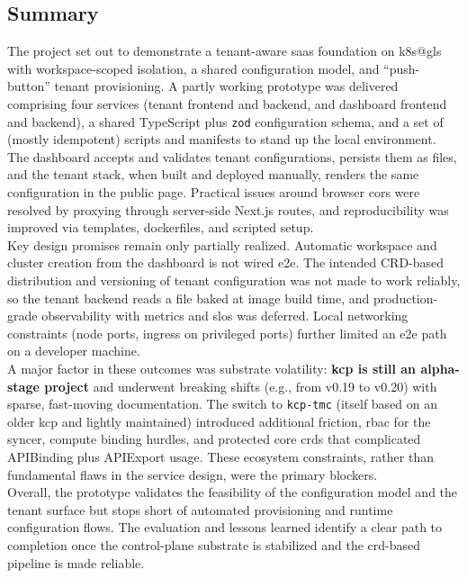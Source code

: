 \documentclass[11pt, a4paper, oneside, listof=totoc]{scrartcl}
\begin{document}
        \subsection{Summary}\label{subsec:summary}
        The project set out to demonstrate a tenant-aware \gls{saas} foundation on \gls{k8s@gls}
        with workspace-scoped isolation, a shared configuration model, and \enquote{push-button}
        tenant provisioning.
        A partly working prototype was delivered comprising four services (tenant frontend and
        backend, and dashboard frontend and backend), a shared TypeScript plus \texttt{zod}
        configuration schema, and a set of (mostly idempotent) scripts and manifests to stand up the
        local environment.
        The dashboard accepts and validates tenant configurations, persists them as files, and the
        tenant stack, when built and deployed manually, renders the same configuration in the public
        page.
        Practical issues around browser \gls{cors} were resolved by proxying through server-side
        Next.js routes, and reproducibility was improved via templates, dockerfiles, and scripted
        setup.\\
        Key design promises remain only partially realized.
        Automatic workspace and cluster creation from the dashboard is not wired \gls{e2e}.
        The intended CRD-based distribution and versioning of tenant configuration was not made to
        work reliably, so the tenant backend reads a file baked at image build time,
        and production-grade observability with metrics and \glspl{slo} was deferred.
        Local networking constraints (node ports, ingress on privileged ports) further limited an
        \gls{e2e} path on a developer machine.\\
        A major factor in these outcomes was substrate volatility:
        \textbf{\gls{kcp} is still an alpha-stage project} and underwent breaking shifts
        (e.g., from v0.19 to v0.20) with sparse, fast-moving documentation.
        The switch to \texttt{\gls{kcp}-\gls{tmc}} (itself based on an older \gls{kcp} and lightly
        maintained) introduced additional friction, \gls{rbac} for the syncer, compute binding
        hurdles, and protected core \glspl{crd} that complicated APIBinding plus APIExport usage.
        These ecosystem constraints, rather than fundamental flaws in the service design, were the
        primary blockers.\\
        Overall, the prototype validates the feasibility of the configuration model and the tenant
        surface but stops short of automated provisioning and runtime configuration flows.
        The evaluation and lessons learned identify a clear path to completion once the
        control-plane substrate is stabilized and the \gls{crd}-based pipeline is made reliable.
\end{document}
